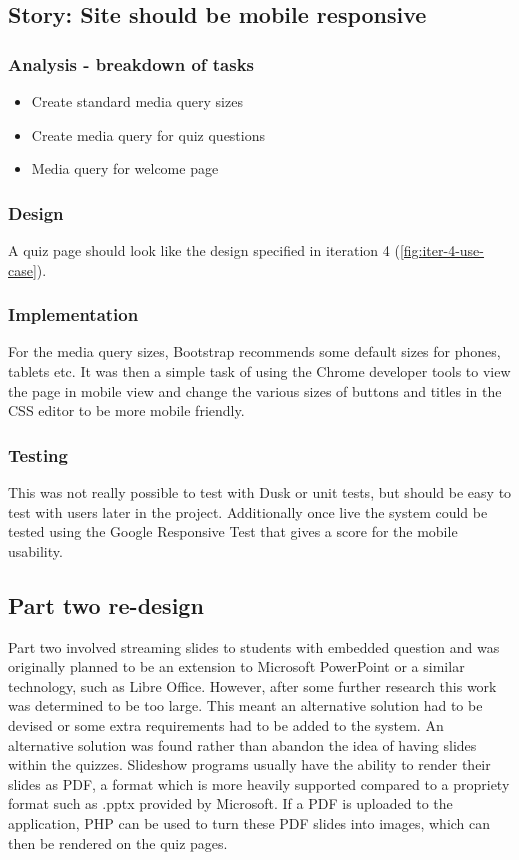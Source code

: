 \subsection{Story: Site should be mobile responsive}
\subsubsection{Analysis - breakdown of tasks}
\begin{itemize}
	\item Create standard media query sizes
	\item Create media query for quiz questions
	\item Media query for welcome page
\end{itemize}
\subsubsection{Design}
A quiz page should look like the design specified in iteration 4  (\ref{fig:iter-4-use-case}).
\subsubsection{Implementation}
For the media query sizes, Bootstrap recommends some default sizes for phones, tablets etc\cite{bootstrap-media-queries}. It was then a simple task of using the Chrome developer tools to view the page in mobile view and change the various sizes of buttons and titles in the CSS editor to be more mobile friendly.
\subsubsection{Testing}
This was not really possible to test with Dusk or unit tests, but should be easy to test with users later in the project. Additionally once live the system could be tested using the Google Responsive Test that gives a score for the mobile usability.
\newpage

\subsection{Part two re-design}
Part two involved streaming slides to students with embedded question and was originally planned to be an extension to Microsoft PowerPoint or a similar technology, such as Libre Office. However, after some further research this work was determined to be too large. This meant an alternative solution had to be devised or some extra requirements had to be added to the system. An alternative solution was found rather than abandon the idea of having slides within the quizzes. Slideshow programs usually have the ability to render their slides as PDF, a format which is more heavily supported compared to a propriety format such as .pptx provided by Microsoft. If a PDF is uploaded to the application, PHP can be used to turn these PDF slides into images, which can then be rendered on the quiz pages.

